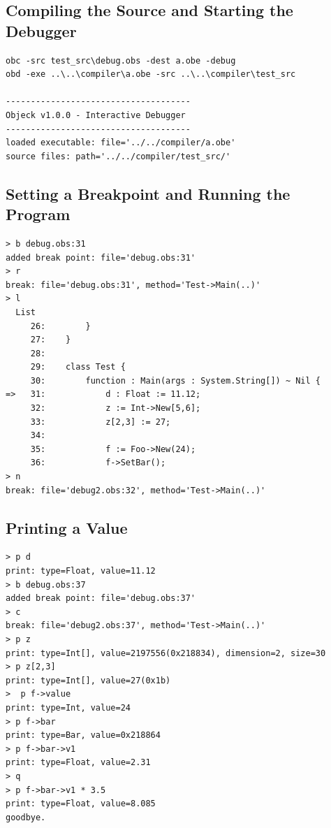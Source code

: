 \documentclass[11pt]{article}
\begin{document}
\subsection{Compiling the Source and Starting the Debugger}
\begin{verbatim}
obc -src test_src\debug.obs -dest a.obe -debug
obd -exe ..\..\compiler\a.obe -src ..\..\compiler\test_src

-------------------------------------
Objeck v1.0.0 - Interactive Debugger
-------------------------------------
loaded executable: file='../../compiler/a.obe'
source files: path='../../compiler/test_src/'
\end{verbatim}

\subsection{Setting a Breakpoint and Running the Program}
\begin{verbatim}
> b debug.obs:31
added break point: file='debug.obs:31'
> r
break: file='debug.obs:31', method='Test->Main(..)'
> l
  List
     26: 		}
     27: 	}
     28: 
     29: 	class Test {
     30: 		function : Main(args : System.String[]) ~ Nil {
=>   31: 			d : Float := 11.12;
     32: 			z := Int->New[5,6];	
     33: 			z[2,3] := 27;
     34: 
     35: 			f := Foo->New(24);
     36: 			f->SetBar();
> n
break: file='debug2.obs:32', method='Test->Main(..)'
\end{verbatim}

\subsection{Printing a Value}
\begin{verbatim}
> p d
print: type=Float, value=11.12
> b debug.obs:37
added break point: file='debug.obs:37'
> c
break: file='debug2.obs:37', method='Test->Main(..)'
> p z
print: type=Int[], value=2197556(0x218834), dimension=2, size=30
> p z[2,3]
print: type=Int[], value=27(0x1b)
>  p f->value
print: type=Int, value=24
> p f->bar
print: type=Bar, value=0x218864
> p f->bar->v1
print: type=Float, value=2.31
> q
> p f->bar->v1 * 3.5
print: type=Float, value=8.085
goodbye.
\end{verbatim}
\end{document}
